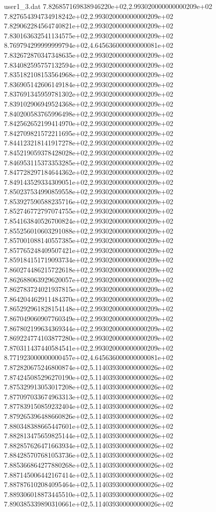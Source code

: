 \begin{filecontents}{user1_3.dat}
7.826857169838946220e+02,2.993020000000000209e+02
7.827654394734918242e+02,2.993020000000000209e+02
7.829062284564740821e+02,2.993020000000000209e+02
7.830163632541134575e+02,2.993020000000000209e+02
8.769794299999999794e+02,4.645636000000000081e+02
7.832672870347348635e+02,2.993020000000000209e+02
7.834082595757132594e+02,2.993020000000000209e+02
7.835182108153564968e+02,2.993020000000000209e+02
7.836905142606149184e+02,2.993020000000000209e+02
7.837691345959781302e+02,2.993020000000000209e+02
7.839102906949524368e+02,2.993020000000000209e+02
7.840200583765996498e+02,2.993020000000000209e+02
7.842562652199414970e+02,2.993020000000000209e+02
7.842709821572211695e+02,2.993020000000000209e+02
7.844123218141917278e+02,2.993020000000000209e+02
7.845219059378428028e+02,2.993020000000000209e+02
7.846953115373353285e+02,2.993020000000000209e+02
7.847728297184644362e+02,2.993020000000000209e+02
7.849143529334309051e+02,2.993020000000000209e+02
7.850237534990859558e+02,2.993020000000000209e+02
7.853927590588235716e+02,2.993020000000000209e+02
7.852746772797074755e+02,2.993020000000000209e+02
7.854163840526700824e+02,2.993020000000000209e+02
7.855256010603291088e+02,2.993020000000000209e+02
7.857001088140557385e+02,2.993020000000000209e+02
7.857765248409507421e+02,2.993020000000000209e+02
7.859184151719093734e+02,2.993020000000000209e+02
7.860274486215722618e+02,2.993020000000000209e+02
7.862688063929620057e+02,2.993020000000000209e+02
7.862783724021937815e+02,2.993020000000000209e+02
7.864204462911484370e+02,2.993020000000000209e+02
7.865292961828154148e+02,2.993020000000000209e+02
7.867049060907760349e+02,2.993020000000000209e+02
7.867802199634369344e+02,2.993020000000000209e+02
7.869224774103877280e+02,2.993020000000000209e+02
7.870311437440584541e+02,2.993020000000000209e+02
8.771923000000000457e+02,4.645636000000000081e+02
7.872820675246800874e+02,5.114039300000000026e+02
7.874245085296270190e+02,5.114039300000000026e+02
7.875329913053017208e+02,5.114039300000000026e+02
7.877097033674963313e+02,5.114039300000000026e+02
7.877839150859232404e+02,5.114039300000000026e+02
7.879265396488660826e+02,5.114039300000000026e+02
7.880348388665447601e+02,5.114039300000000026e+02
7.882813475659825144e+02,5.114039300000000026e+02
7.882857626471663934e+02,5.114039300000000026e+02
7.884285707681053736e+02,5.114039300000000026e+02
7.885366864277880268e+02,5.114039300000000026e+02
7.887145006442167414e+02,5.114039300000000026e+02
7.887876102084095464e+02,5.114039300000000026e+02
7.889306018873445510e+02,5.114039300000000026e+02
7.890385339890310661e+02,5.114039300000000026e+02

\end{filecontents}
